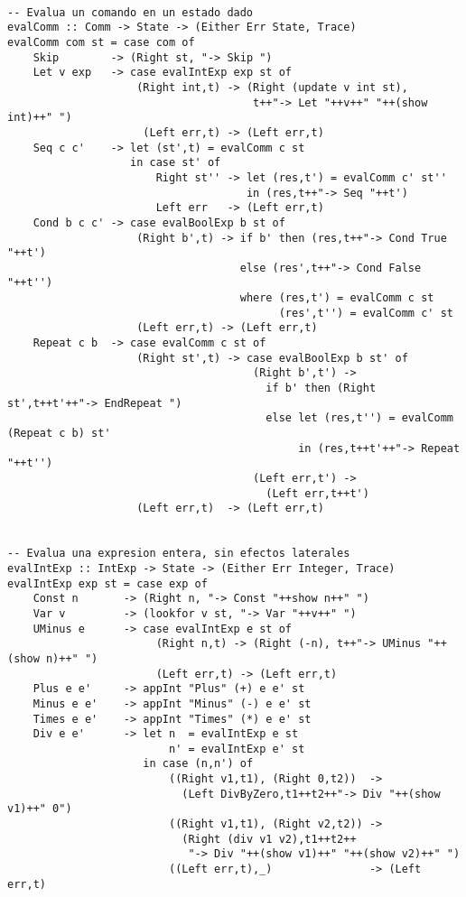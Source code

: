 \documentclass[12pt,a4paper]{article}
\begin{document}
\begin{verbatim}

-- Evalua un comando en un estado dado
evalComm :: Comm -> State -> (Either Err State, Trace)
evalComm com st = case com of
    Skip        -> (Right st, "-> Skip ")
    Let v exp   -> case evalIntExp exp st of
                    (Right int,t) -> (Right (update v int st),
                                      t++"-> Let "++v++" "++(show int)++" ")
                     (Left err,t) -> (Left err,t)
    Seq c c'    -> let (st',t) = evalComm c st
                   in case st' of
                       Right st'' -> let (res,t') = evalComm c' st''
                                     in (res,t++"-> Seq "++t')
                       Left err   -> (Left err,t)
    Cond b c c' -> case evalBoolExp b st of
                    (Right b',t) -> if b' then (res,t++"-> Cond True "++t')
                                    else (res',t++"-> Cond False "++t'')
                                    where (res,t') = evalComm c st
                                          (res',t'') = evalComm c' st
                    (Left err,t) -> (Left err,t)
    Repeat c b  -> case evalComm c st of
                    (Right st',t) -> case evalBoolExp b st' of
                                      (Right b',t') -> 
                                        if b' then (Right st',t++t'++"-> EndRepeat ")
                                        else let (res,t'') = evalComm (Repeat c b) st'
                                             in (res,t++t'++"-> Repeat "++t'')
                                      (Left err,t') ->
                                        (Left err,t++t')
                    (Left err,t)  -> (Left err,t)


-- Evalua una expresion entera, sin efectos laterales
evalIntExp :: IntExp -> State -> (Either Err Integer, Trace)
evalIntExp exp st = case exp of
    Const n       -> (Right n, "-> Const "++show n++" ")
    Var v         -> (lookfor v st, "-> Var "++v++" ")
    UMinus e      -> case evalIntExp e st of
                       (Right n,t) -> (Right (-n), t++"-> UMinus "++(show n)++" ")
                       (Left err,t) -> (Left err,t)
    Plus e e'     -> appInt "Plus" (+) e e' st
    Minus e e'    -> appInt "Minus" (-) e e' st
    Times e e'    -> appInt "Times" (*) e e' st
    Div e e'      -> let n  = evalIntExp e st
                         n' = evalIntExp e' st
                     in case (n,n') of
                         ((Right v1,t1), (Right 0,t2))  -> 
                           (Left DivByZero,t1++t2++"-> Div "++(show v1)++" 0")
                         ((Right v1,t1), (Right v2,t2)) ->
                           (Right (div v1 v2),t1++t2++
                            "-> Div "++(show v1)++" "++(show v2)++" ")
                         ((Left err,t),_)               -> (Left err,t)



\end{verbatim}
\end{document}
